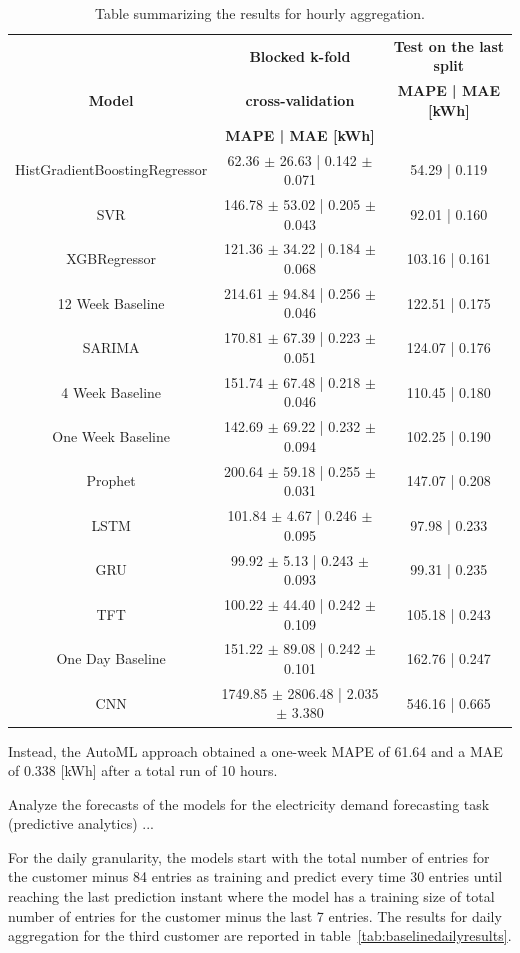 \begin{table}[H]
\centering
\begin{tabular}{|c|c|c|}
\hline
 & \textbf{Blocked k-fold} & \textbf{Test on the last split}\\
\textbf{Model} & \textbf{cross-validation} & \textbf{MAPE | MAE [kWh]}\\
 & \textbf{MAPE | MAE [kWh]} & \\
\hline
HistGradientBoostingRegressor & 62.36 $\pm$ 26.63 | 0.142 $\pm$ 0.071 & 54.29 | 0.119\\
\hline
SVR & 146.78 $\pm$ 53.02 | 0.205 $\pm$ 0.043 & 92.01 | 0.160\\
\hline
XGBRegressor & 121.36 $\pm$ 34.22 | 0.184 $\pm$ 0.068 & 103.16 | 0.161\\
\hline
12 Week Baseline & 214.61 $\pm$ 94.84 | 0.256 $\pm$ 0.046 & 122.51 | 0.175\\
\hline
SARIMA & 170.81 $\pm$ 67.39 | 0.223 $\pm$ 0.051 & 124.07 | 0.176\\
\hline
4 Week Baseline & 151.74 $\pm$ 67.48 | 0.218 $\pm$ 0.046 & 110.45 | 0.180\\
\hline
One Week Baseline & 142.69 $\pm$ 69.22 | 0.232 $\pm$ 0.094 & 102.25 | 0.190\\
\hline
Prophet & 200.64 $\pm$ 59.18 | 0.255 $\pm$ 0.031 & 147.07 | 0.208\\
\hline
LSTM & 101.84 $\pm$ 4.67 | 0.246 $\pm$ 0.095 & 97.98 | 0.233\\  %
\hline
GRU & 99.92 $\pm$ 5.13 | 0.243 $\pm$ 0.093 & 99.31 | 0.235\\  %
\hline
TFT & 100.22 $\pm$ 44.40 | 0.242 $\pm$ 0.109 & 105.18 | 0.243\\
\hline
One Day Baseline & 151.22 $\pm$ 89.08 | 0.242 $\pm$ 0.101 & 162.76 | 0.247\\
\hline
CNN & 1749.85 $\pm$ 2806.48 | 2.035 $\pm$ 3.380 & 546.16 | 0.665\\  %
\hline
\end{tabular}
\caption{Table summarizing the results for hourly aggregation.}
\label{tab:baselinehourlyresults}
\end{table}

Instead, the AutoML approach obtained a one-week MAPE of 61.64 and a MAE of 0.338 [kWh] after a total run of 10 hours.

Analyze the forecasts of the models for the electricity demand forecasting task (predictive analytics) ...

For the daily granularity, the models start with the total number of entries for the customer minus 84 entries as training and predict every time 30 entries until reaching the last prediction instant where the model has a training size of total number of entries for the customer minus the last 7 entries.
The results for daily aggregation for the third customer are reported in table~\ref{tab:baselinedailyresults}.


